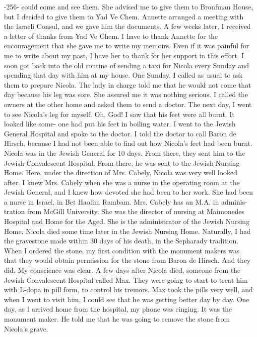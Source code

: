 ﻿-256- 
could come and see them.
She advised me to give them to Bronfman House, but I decided to give them to Yad Ve Chem.
Annette 
arranged a meeting with the Israeli Consul, and we gave him the documents.
A few weeks later, I received a letter of thanks from Yad 
Ve Chem.
I have to thank Annette for the encouragement that she gave me 
to write my memoirs.
Even if it was painful for me to write about 
my past, I have her to thank for her support in this effort.
I soon got back into the old routine of sending a taxi for Nicola every Sunday and spending that day with him at my house.
One 
Sunday, I called as usual to ask them to prepare Nicola.
The lady 
in charge told me that he would not come that day because his leg 
was sore.
She assured me it was nothing serious.
I called the owners 
at the other home and asked them to send a doctor.
The next day, I went to see Nicola's leg for myself.
Oh, God!
I saw that his feet were all burnt.
It looked like some-
one had put his feet in boiling water.
I went to the Jewish General 
Hospital and spoke to the doctor.
I told the doctor to call Baron 
de Hirsch, because I had not been able to find out how Nicola's 
feet had been burnt.
Nicola was in the Jewish General for 10 days.
From there, they 
sent him to the Jewish Convalescent Hospital.
From there, he was 
sent to the Jewish Nursing Home.
Here, under the direction of Mrs.
Cabely, Nicola was very well looked after.
I knew Mrs.
Cabely when 
she was a nurse in the operating room at the Jewish General, and I 
knew how devoted she had been to her work.
She had been a nurse in 
Israel, in Bet Haolim Rambam.
Mrs.
Cabely has an M.A.
in adminis-
tration from McGill University.
She was the director of nursing at 
Maimonedes Hospital and Home for the Aged.
She is the administrator of the Jewish Nursing Home.
Nicola died some time later in the Jewish Nursing Home.
Naturally, I had the gravestone made within 30 days of 
his death, in the Sepharady tradition.
When I ordered the stone, 
my first condition with the monument makers was that they would obtain permission for the stone from Baron de Hirsch.
And they did.
My conscience was clear.
A few days after Nicola died, someone from the Jewish Convalescent Hospital called Max.
They were going to start to treat him with 
L-dopa in pill form, to control his tremors.
Max took the pills 
very well, and when I went to visit him, I could see that he was getting better day by day.
One day, as I arrived home from the hospital, my phone was ringing.
It was the monument maker.
He told me that he was going to remove the stone from Nicola's grave.
